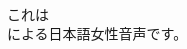 \documentclass[8pt]{extreport}
\begin{document}
\begin{CJK}{UTF8}{min}
\\	これは 
\\	による日本語女性音声です。	
\end{CJK}
\end{document}
